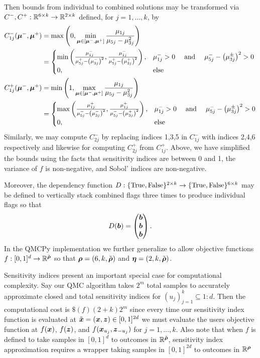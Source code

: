 \documentclass{article}[12pt]
\begin{document}
Then bounds from individual to combined solutions may be transformed via $C^-,C^+:\mathbb{R}^{6 \times k} \to \mathbb{R}^{2 \times k}$ defined, for $j=1,\dots,k$, by  
\begin{align*}
    C_{1j}^-(\boldsymbol{\mu}^-,\boldsymbol{\mu}^+) 
    &= \max\left(0,\min_{\boldsymbol{\mu} \in [\boldsymbol{\mu}^-,\boldsymbol{\mu}^+]} \frac{\mu_{1j}}{\mu_{5j}-\mu_{3j}^2}\right) \\
    &= \begin{cases} 
        \min\left(\frac{\mu_{1j}^-}{\mu_{5j}^+-\left(\mu_{3j}^-\right)^2},\frac{\mu_{1j}^-}{\mu_{5j}^+-\left(\mu_{3j}^+\right)^2}\right), & \mu_{1j}^->0 \quad\text{ and }\quad \mu_{5j}^--\left(\mu_{3j}^\pm\right)^2>0 \\
        0, &\text{else}
    \end{cases} \\
    C_{1j}^+(\boldsymbol{\mu}^-,\boldsymbol{\mu}^+) 
    &= \min\left(1,\max_{\boldsymbol{\mu} \in [\boldsymbol{\mu}^-,\boldsymbol{\mu}^+]} \frac{\mu_{1j}}{\mu_{5j}-\mu_{3j}^2}\right) \\
    &= \begin{cases} 
        \max\left(\frac{\mu_{1j}^+}{\mu_{5j}^--\left(\mu_{3j}^-\right)^2},\frac{\mu_{1j}^+}{\mu_{5j}^--\left(\mu_{3j}^+\right)^2}\right), & \mu_{1j}^->0 \quad\text{ and }\quad \mu_{5j}^--\left(\mu_{3j}^\pm\right)^2>0 \\
        0, &\text{else}
    \end{cases}
\end{align*}
Similarly, we may compute $C_{2j}^-$ by replacing indices 1,3,5 in $C_{1j}^-$ with indices 2,4,6 respectively and likewise for computing $C_{2j}^+$ from $C_{1j}^+$. Above, we have simplified the bounds using the facts that sensitivity indices are between 0 and 1, the variance of $f$ is non-negative, and Sobol' indices are non-negative. 

Moreover, the dependency function $D:\{\text{True},\text{False}\}^{2 \times k} \to \{\text{True},\text{False}\}^{6 \times k}$ may be defined to vertically stack combined flags three times to produce individual flags so that 
\begin{equation*}
    D(\boldsymbol{b}) = \begin{pmatrix} \boldsymbol{b} \\ \boldsymbol{b} \\ \boldsymbol{b} \end{pmatrix}.
\end{equation*}
In the QMCPy implementation we further generalize to allow objective functions $f:[0,1]^d \to \mathbb{R}^{\tilde{\boldsymbol{\rho}}}$ so that $\boldsymbol{\rho} = (6,k,\tilde{\boldsymbol{\rho}})$ and $\boldsymbol{\eta} = (2,k,\tilde{\boldsymbol{\rho}})$.

Sensitivity indices present an important special case for computational complexity. Say our QMC algorithm takes $2^m$ total samples to accurately approximate closed and total sensitivity indices for $(u_j)_{j=1}^k \subseteq 1:d$. Then the computational cost is $\$(f)(2+k)2^m$ since every time our sensitivity index function is evaluated at $\tilde{\boldsymbol{x}} = (\boldsymbol{x},\boldsymbol{z}) \in [0,1]^{2d}$ we must evaluate the users objective function at $f(\boldsymbol{x})$, $f(\boldsymbol{z})$, and $f(\boldsymbol{x}_{u_j},\boldsymbol{z}_{-{u_j}})$ for $j=1,\dots,k$. Also note that when $f$ is defined to take samples in  $[0,1]^d$ to outcomes in $\mathbb{R}^{\tilde{\boldsymbol{\rho}}}$, sensitivity index approximation requires a wrapper taking samples in $[0,1]^{2d}$ to outcomes in $\mathbb{R}^{\boldsymbol{\rho}}$
\end{document}

